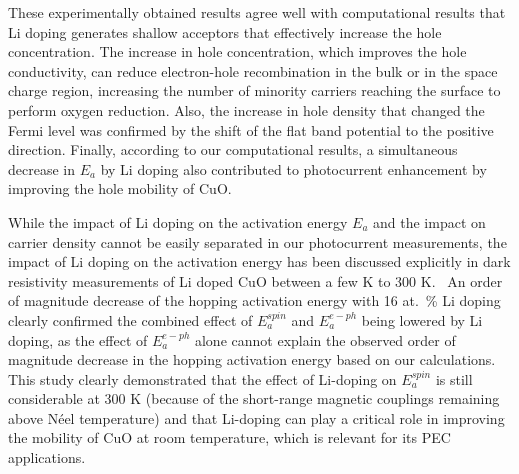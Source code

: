 These experimentally obtained results agree well with computational results that Li doping generates shallow acceptors that effectively increase the hole concentration. The increase in hole concentration, which improves the hole conductivity, can reduce electron-hole recombination in the bulk or in the space charge region, increasing the number of minority carriers reaching the surface to perform oxygen reduction. Also, the increase in hole density that changed the Fermi level was confirmed by the shift of the flat band potential to the positive direction. Finally, according to our computational results, a simultaneous decrease in $E_a$ by Li doping also contributed to photocurrent enhancement by improving the hole mobility of CuO.

While the impact of Li doping on the activation energy $E_a$ and the impact on carrier density cannot be easily separated in our photocurrent measurements, the impact of Li doping on the activation energy has been discussed explicitly in dark resistivity measurements of Li doped CuO between a few K to 300 K.~\cite{zheng2004fast,gao2007ferromagnetic} An order of magnitude decrease of the hopping activation energy with 16 at.\ \% Li doping clearly confirmed the combined effect of $E_a^{spin}$ and $E_a^{e-ph}$ being lowered by Li doping, as the effect of $E_a^{e-ph}$ alone cannot explain the observed order of magnitude decrease in the hopping activation energy based on our calculations.~\cite{zheng2004fast} This study clearly demonstrated that the effect of Li-doping on $E_a^{spin}$ is still considerable at 300 K (because of the short-range magnetic couplings remaining above N\'eel temperature)\cite{zheng2001evidence,yang1989magnetic} and that Li-doping can play a critical role in improving the mobility of CuO at room temperature, which is relevant for its PEC applications.


